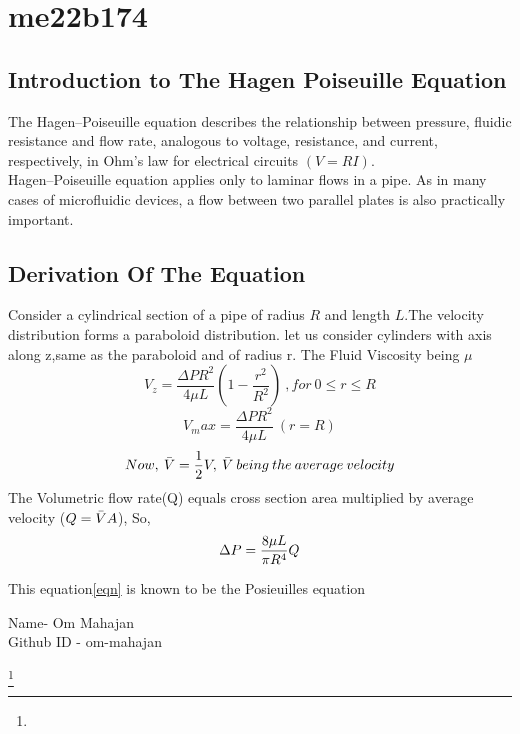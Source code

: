 \section{me22b174}
\subsection{Introduction to The Hagen Poiseuille Equation}
The Hagen–Poiseuille equation\cite{OSTADFAR20161} describes the relationship between pressure, fluidic resistance and flow rate, analogous to voltage, resistance, and current, respectively, in Ohm’s law for electrical circuits $(V=RI)$.\\
Hagen–Poiseuille equation applies only to laminar flows in a pipe. As in many cases of microfluidic devices, a flow between two parallel plates is also practically important. \\

\subsection{Derivation Of The Equation}
Consider a cylindrical section of a pipe of radius $R$ and length $L$.The velocity distribution forms a paraboloid distribution. let us consider cylinders with axis along z,same as the paraboloid and of radius r. The Fluid Viscosity being $\mu$
\begin{equation}
    V_z = \frac{\Delta P R^2}{4 \mu L}(1-\frac{r^2}{R^2}) 
    \:, for\: 0\leq r\leq R
\end{equation}
\begin{equation}
     V_max = \frac{\Delta P R^2}{4 \mu L} \:(r=R) 
\end{equation}
\begin{equation}
    Now,\: \Bar{V} = \frac{1}{2} V ,\: \Bar{V}\: being\: the \:average\: velocity
\end{equation}
The Volumetric flow rate(Q) equals cross section area multiplied by average velocity ($Q = \Bar{V}A$), So,
\begin{equation}\label{eqn}
   \Delta P = {\frac{8\mu L}{\pi R^4}} Q  \\ 
\end{equation}

This equation\ref{eqn} is known to be the Posieuilles equation
\\
\begin{flushleft}
    Name- Om Mahajan\\
    Github ID - om-mahajan
\end{flushleft}
\footnote{}
\\
